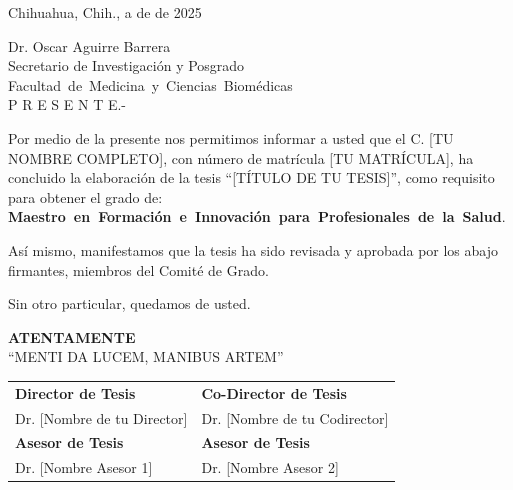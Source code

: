 \documentclass[12pt,letterpaper,oneside]{report}
\newcommand{\miFacultad}{Facultad~de~Medicina~y~Ciencias~Biom\'edicas}  %
\newcommand{\miGrado}{Maestro~en~Formaci\'on~e~Innovaci\'on~para~Profesionales~de~la~Salud}  %
\newcommand{\miTitulo}{[T\'ITULO DE TU TESIS]}
\newcommand{\miAutor}{[TU NOMBRE COMPLETO]}
\newcommand{\miSecretario}{Dr. Oscar Aguirre Barrera}
\newcommand{\miSecretarioCargo}{Secretario de Investigaci\'on y Posgrado}
\newcommand{\miDirector}{Dr. [Nombre de tu Director]}
\newcommand{\miCodirector}{Dr. [Nombre de tu Codirector]}
\newcommand{\miAsesorUno}{Dr. [Nombre Asesor 1]}
\newcommand{\miAsesorDos}{Dr. [Nombre Asesor 2]}
\begin{document}
\begin{flushright}
{\fontsize{12}{14}\selectfont Chihuahua, Chih., a \underline{\hspace{1.5cm}} de \underline{\hspace{1.5cm}} de 2025}\\[0.3cm]
\end{flushright}

\noindent
{\fontsize{12}{14}\selectfont 
\miSecretario\\[0.1cm]
\miSecretarioCargo\\[0.1cm]
\miFacultad\\[0.3cm]

P {\hspace{0.15cm}} R {\hspace{0.15cm}} E {\hspace{0.15cm}} S {\hspace{0.15cm}} E {\hspace{0.15cm}} N {\hspace{0.15cm}} T {\hspace{0.15cm}} E.-\\[0.3cm]
}

{\fontsize{12}{14}\selectfont
\setlength{\parindent}{0cm}   %
\setlength{\parskip}{0.2cm}   %

\noindent Por medio de la presente nos permitimos informar a usted que el C. \miAutor, con n\'umero de matr\'icula [TU MATR\'ICULA], ha concluido la elaboraci\'on de la tesis ``\miTitulo'', como requisito para obtener el grado de: \textbf{\miGrado}.

As\'i mismo, manifestamos que la tesis ha sido revisada y aprobada por los abajo firmantes, miembros del Comit\'e de Grado.

Sin otro particular, quedamos de usted.

}

\begin{center}
{\fontsize{12}{14}\selectfont\bfseries ATENTAMENTE}\\[0.3cm]
{\fontsize{12}{14}\selectfont ``MENTI DA LUCEM, MANIBUS ARTEM''}\\[0.5cm]
\end{center}

\begin{center}
\begin{tabular}{@{}p{6.5cm}p{6.5cm}@{}}
\rule{0pt}{10pt}\textbf{Director de Tesis} & \textbf{Co-Director de Tesis}\\[0.3cm]

\miDirector & \miCodirector\\[0.8cm]

\textbf{Asesor de Tesis} & \textbf{Asesor de Tesis}\\[0.3cm]

\miAsesorUno & \miAsesorDos\\[0.3cm]
\end{tabular}
\end{center}
\end{document}
